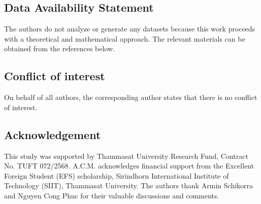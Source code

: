 \documentclass[12pt]{amsart}
\numberwithin{equation}{section}
\theoremstyle{plain}
\theoremstyle{definition}
\theoremstyle{remark}
\begin{document}
\subsection*{Data Availability Statement}
The authors do not analyze or generate any datasets because this work proceeds with a theoretical and mathematical approach. The relevant materials can be obtained from the references below.

\subsection*{Conflict of interest} 
On behalf of all authors, the corresponding author states that there is no conflict of interest.

\subsection*{Acknowledgement}
This study was supported by Thammasat University Research Fund, Contract No. TUFT 072/2568.  
A.C.M. acknowledges financial support from the Excellent Foreign Student (EFS) scholarship,  Sirindhorn International Institute of Technology (SIIT),  Thammasat University.
The authors thank Armin Schikorra and Nguyen Cong Phuc for their valuable discussions and comments.

\end{document}
